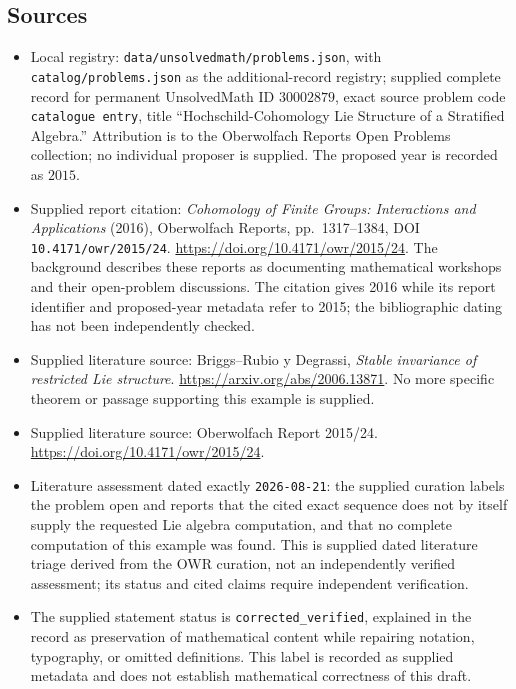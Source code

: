 \documentclass[11pt]{article}
\begin{document}
\subsection{Sources}
\begin{itemize}
\item Local registry: \texttt{data/unsolvedmath/problems.json}, with \texttt{catalog/problems.json} as the additional-record registry; supplied complete record for permanent UnsolvedMath ID \(30002879\), exact source problem code \texttt{catalogue entry}, title ``Hochschild-Cohomology Lie Structure of a Stratified Algebra.'' Attribution is to the Oberwolfach Reports Open Problems collection; no individual proposer is supplied. The proposed year is recorded as \(2015\).
\item Supplied report citation: \emph{Cohomology of Finite Groups: Interactions and Applications} (2016), Oberwolfach Reports, pp.\ 1317--1384, DOI \texttt{10.4171/owr/2015/24}. \url{https://doi.org/10.4171/owr/2015/24}. The background describes these reports as documenting mathematical workshops and their open-problem discussions. The citation gives 2016 while its report identifier and proposed-year metadata refer to 2015; the bibliographic dating has not been independently checked.
\item Supplied literature source: Briggs--Rubio y Degrassi, \emph{Stable invariance of restricted Lie structure}. \url{https://arxiv.org/abs/2006.13871}. No more specific theorem or passage supporting this example is supplied.
\item Supplied literature source: Oberwolfach Report 2015/24. \url{https://doi.org/10.4171/owr/2015/24}.
\item Literature assessment dated exactly \texttt{2026-08-21}: the supplied curation labels the problem open and reports that the cited exact sequence does not by itself supply the requested Lie algebra computation, and that no complete computation of this example was found. This is supplied dated literature triage derived from the OWR curation, not an independently verified assessment; its status and cited claims require independent verification.
\item The supplied statement status is \texttt{corrected\_verified}, explained in the record as preservation of mathematical content while repairing notation, typography, or omitted definitions. This label is recorded as supplied metadata and does not establish mathematical correctness of this draft.
\end{itemize}
\end{document}
